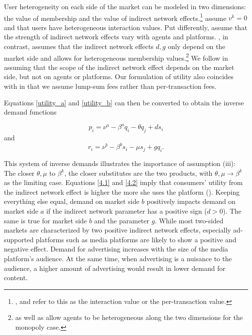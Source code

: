 \documentclass[12pt,a4paper,notitlepage]{article}
\begin{document}
User heterogeneity on each side of the market can be modeled in two dimensions: the value of membership and the value of indirect network effects.\footnote{\cite{weyl_price_2010}, \cite{rochet_platform_2003} and \cite{armstrong_competition_2006} refer to this as the interaction value or the per-transaction value.} \cite{rochet_platform_2003} assume $v^k=0$ and that users have heterogeneous interaction values. Put differently, \cite{rochet_platform_2003} assume that the strength of indirect network effects vary with agents and platforms. \cite{armstrong_competition_2006}, in contrast, assumes that the indirect network effects $d,g$ only depend on the market side and allows for heterogeneous membership values.\footnote{\cite{rochet_platform_2003} as well as \cite{weyl_price_2010} allow agents to be heterogeneous along the two dimensions for the monopoly case.} We follow \cite{armstrong_competition_2006} in assuming that the scope of the indirect network effect depends on the market side, but not on agents or platforms. Our formulation of utility also coincides with \cite{armstrong_competition_2006} in that we assume lump-sum fees rather than per-transaction fees. 

Equations \ref{utility_a} and \ref{utility_b} can then be converted to obtain the inverse demand functions

\begin{equation}
p_i=\nu^a-\beta^a q_i - \theta q_j +ds_i
\end{equation}
and
\begin{equation}
r_i=\nu^b-\beta^b s_i - \mu s_j +gq_i.
\end{equation} 

This system of inverse demands illustrates the importance of assumption (iii): The closer $\theta, \mu$ to $\beta^k$, the closer substitutes are the two products, with $\theta, \mu \to \beta^ k$ as the limiting case. Equations \ref{4.1} and \ref{4.2} imply that consumers' utility from the indirect network effect is higher the more she uses the platform (\cite{kind_business_2009}). Keeping everything else equal, demand on market side $b$ positively impacts demand on market side $a$ if the indirect network parameter has a positive sign ($d > 0$). The same is true for market side $b$ and the parameter $g$. While most two-sided markets are characterized by two positive indirect network effects, especially ad-supported platforms such as media platforms are likely to show a positive and negative effect. Demand for advertising increases with the size of the media platform's audience. At the same time, when advertising is a nuisance to the audience, a higher amount of advertising would result in lower demand for content.
\end{document}
